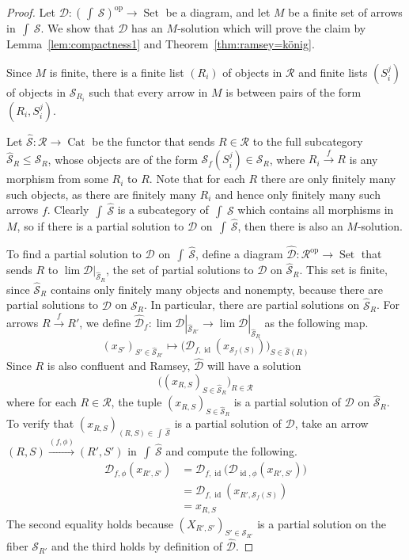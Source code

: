 \documentclass[preprint,12pt]{elsarticle}
\newcommand{\cat}[1]{\mathcal{#1}}
\newcommand{\op}{^{\mathop{op}}}
\DeclareMathOperator{\Set}{Set}
\DeclareMathOperator{\Cat}{Cat}
\DeclareMathOperator{\Elts}{\int\!}
\DeclareMathOperator{\id}{id}
\begin{document}
\begin{proof}
    Let $\cat D:(\Elts\cat S)\op\to \Set$ be a diagram, and let $M$ be a finite set of arrows in $\Elts\cat S$. We show that $\cat D$ has an $M$-solution which will prove the claim by Lemma~\ref{lem:compactness1} and Theorem~\ref{thm:ramsey=könig}.

    Since $M$ is finite, there is a finite list $(R_i)$ of objects in $\cat R$ and finite lists $(S_i^j)$ of objects in $\cat S_{R_i}$ such that every arrow in $M$ is between pairs of the form $(R_i,S_i^j)$. 

    Let $\hat{\cat S}:\cat R\to\Cat $ be the functor that sends $R\in \cat R$ to the full subcategory $\hat{\cat S}_R\leq\cat S_R$, whose objects are of the form $\cat S_f(S_i^j)\in \cat S_R$, where $R_i\xrightarrow{f}R$ is any morphism from some $R_i$ to $R$. Note that for each $R$ there are only finitely many such objects, as there are finitely many $R_i$ and hence only finitely many such arrows $f$. 
    Clearly $\Elts\hat{\cat S}$ is a subcategory of $\Elts\cat S$ which contains all morphisms in $M$, so if there is a partial solution to $\cat D$ on $\Elts\hat{\cat S}$, then there is also an $M$-solution.

    To find a partial solution to $\cat D$ on $\Elts\hat{\cat S}$, define a diagram $\hat{\cat D}: \cat R\op\to\Set$ that sends $R$ to $\lim\cat D|_{\hat{\cat S}_R}$, the set of partial solutions to $\cat D$ on $\hat{\cat S}_R$.
    This set is finite, since $\hat{\cat S}_R$ contains only finitely many objects and nonempty, because there are partial solutions to $\cat D$ on $\cat S_R$. In particular, there are partial solutions on $\hat{\cat S}_R$.
    For arrows $R\xrightarrow{f}R'$, we define $\hat{\cat D}_f:\lim\cat D|_{\hat{\cat S}_{R'}}\to \lim\cat D|_{\hat{\cat S}_R}$ as the following map. 
    $$
    (x_{S'})_{S'\in\hat{\cat S}_{R'}}\mapsto 
    \big(\cat D_{f,\id} (x_{\cat S_f(S)}) \big)_{S\in\hat{\cat S} (R)} %
    $$
    Since $R$ is also confluent and Ramsey, $\hat{\cat D}$ will have a solution
    $$
    \big((x_{R,S})_{S\in\hat{\cat S}_R}\big)_{R\in \cat R}
    $$
    where for each $R\in\cat R$, the tuple $(x_{R,S})_{S\in\hat{\cat S}_R}$ is a partial solution of $\cat D$ on $\hat{\cat S}_R$. To verify that $(x_{R,S})_{(R,S)\in\Elts\hat{\cat S}}$ is a partial solution of $\cat D$, take an arrow $(R,S)\xrightarrow{(f,\phi)}(R',S')$ in $\Elts\hat{\cat S}$ and compute the following.
    \begin{align*}
    \cat D_{f,\phi}(x_{R',S'})&=
    \cat D_{f,\id} \big(\cat D_{\id,\phi} (x_{R',S'})\big) \\&=  
    \cat D_{f,\id} (x_{R',\cat S_f(S)}) \\&=
    x_{R,S}
    \end{align*}
    The second equality holds because $(X_{R',S'})_{S'\in \cat S_{R'}}$ is a partial solution on the fiber $\cat S_{R'}$ and the third holds by definition of $\hat{\cat D}$.
\end{proof}
\end{document}
